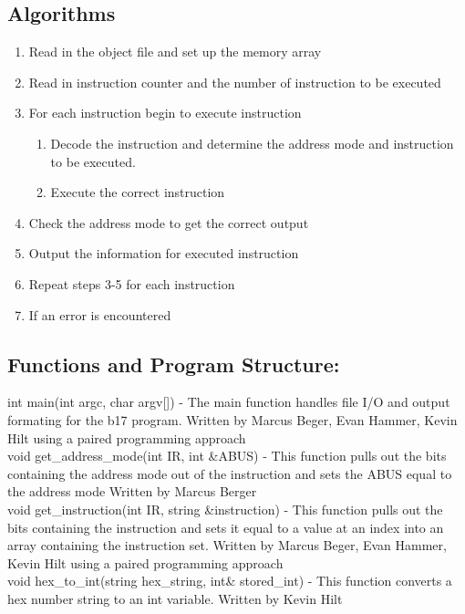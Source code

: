 \documentclass[11pt]{article}
\begin{document}
\subsection{Algorithms}
\begin{enumerate}
\item Read in the object file and set up the memory array
\item Read in instruction counter and the number of instruction to be executed
\item For each instruction  begin to execute instruction
\begin{enumerate}\item Decode the instruction and determine the address mode and instruction to be executed.
\item Execute the correct instruction \end{enumerate}
\item Check the address mode to get the correct output
\item Output the information for executed instruction 
\item Repeat steps 3-5 for each instruction
\item If an error is encountered 
\end{enumerate}

\subsection{Functions and Program Structure:}
int main(int argc, char\* argv[]) - The main function handles file I/O and output formating for the b17 program. Written by Marcus Beger, Evan Hammer, Kevin Hilt using a paired programming approach\\

void get\_address\_mode(int IR, int \&ABUS) - This function pulls out the bits containing the address mode out of the  instruction and sets the ABUS equal to the address mode Written by Marcus Berger\\

void get\_instruction(int IR, string \&instruction) - This function pulls out the bits containing the instruction and sets it equal to a value at an index into an array containing the instruction set. Written by Marcus Beger, Evan Hammer, Kevin Hilt using a paired programming approach\\

void hex\_to\_int(string hex\_string, int\& stored\_int) - This function converts a hex number string to an int variable. Written by Kevin Hilt\\
\end{document}
